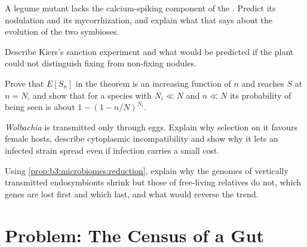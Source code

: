 \begin{exercise}[$\star\star$]\label{exo:b3:microbiomes:8}
A legume mutant lacks the calcium-spiking component of the . Predict its nodulation and its mycorrhization, and
explain what that says about the evolution of the two symbioses.
\end{exercise}

\begin{exercise}[$\star\star$]\label{exo:b3:microbiomes:9}
Describe Kiers's sanction experiment and what would be predicted if
the plant could not distinguish fixing from non-fixing nodules.
\end{exercise}

\begin{exercise}[$\star\star\star$]\label{exo:b3:microbiomes:10}
Prove that $E[S_{n}]$ in the  theorem is an increasing
function of $n$ and reaches $S$ at $n = N$, and show that for a species
with $N_{i} \ll N$ and $n \ll N$ its probability of being seen is about
$1 - (1 - n/N)^{N_{i}}$.
\end{exercise}

\begin{exercise}[$\star\star\star$]\label{exo:b3:microbiomes:11}
\emph{Wolbachia} is transmitted only through eggs. Explain why
selection on it favours female hosts, describe cytoplasmic
incompatibility and show why it lets an infected strain spread even
if infection carries a small cost.
\end{exercise}

\begin{exercise}[$\star\star\star$]\label{exo:b3:microbiomes:12}
Using \cref{prop:b3:microbiomes:reduction}, explain why the genomes of
vertically transmitted endosymbionts shrink but those of free-living
relatives do not, which genes are lost first and which last, and what
would reverse the trend.
\end{exercise}

\section{Problem: The Census of a Gut}

